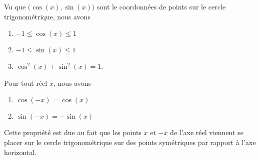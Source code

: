 \begin{propriete}
    Vu que \( \big( \cos(x),\sin(x) \big)\) sont le coordonnées de points sur le cercle trigonométrique, nous avons
    \begin{enumerate}
        \item
            \( -1\leq \cos(x)\leq 1\)
        \item
            \( -1\leq \sin(x)\leq 1\)
        \item
            \( \cos^2(x)+\sin^2(x)=1\).
    \end{enumerate}
\end{propriete}

\begin{propriete}
    Pour tout réel \( x\), nous avons
    \begin{enumerate}
        \item
            \( \cos(-x)=\cos(x)\)
        \item
        \( \sin(-x)=-\sin(x)\)
    \end{enumerate}
\end{propriete}
Cette propriété est due au fait que les points \( x\) et \( -x\) de l'axe réel viennent se placer sur le cercle trigonométrique sur des points symétriques par rapport à l'axe horizontal.

